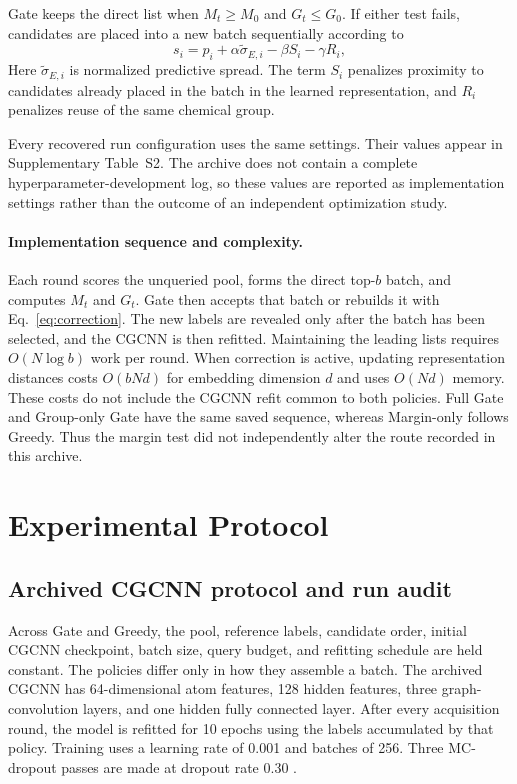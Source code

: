 Gate keeps the direct list when $M_t\ge M_0$ and $G_t\le G_0$. If either test
fails, candidates are placed into a new batch sequentially according to
\begin{equation}
s_i=p_i+\alpha\widetilde{\sigma}_{E,i}-\beta S_i-\gamma R_i,
\label{eq:correction}
\end{equation}
Here $\widetilde{\sigma}_{E,i}$ is normalized predictive spread. The term $S_i$
penalizes proximity to candidates already placed in the batch in the learned
representation, and $R_i$ penalizes reuse of the same chemical group.

Every recovered run configuration uses the same settings. Their values appear
in Supplementary Table~S2. The archive does not
contain a complete hyperparameter-development log, so these values are reported
as implementation settings rather than the outcome of an independent
optimization study.

\paragraph{Implementation sequence and complexity.}
Each round scores the unqueried pool, forms the direct top-$b$ batch, and
computes $M_t$ and $G_t$. Gate then accepts that batch or rebuilds it with
Eq.~\eqref{eq:correction}. The new labels are revealed only after the batch has
been selected, and the CGCNN is then refitted. Maintaining the leading lists
requires $O(N\log b)$ work per round. When correction is active, updating
representation distances costs $O(bNd)$ for embedding dimension $d$ and uses
$O(Nd)$ memory. These costs do not include the CGCNN refit common to both
policies. Full Gate and Group-only Gate have the same saved sequence, whereas
Margin-only follows Greedy. Thus the margin test did not independently alter
the route recorded in this archive.

\section{Experimental Protocol}

\subsection{Archived CGCNN protocol and run audit}

Across Gate and Greedy, the pool, reference labels, candidate order, initial
CGCNN checkpoint, batch size, query budget, and refitting schedule are held
constant. The policies differ only in how they assemble a batch. The archived CGCNN has
64-dimensional atom features, 128 hidden features, three graph-convolution
layers, and one hidden fully connected layer. After every acquisition round,
the model is refitted for 10 epochs using the labels accumulated by that policy.
Training uses a learning rate of 0.001 and batches of 256. Three MC-dropout
passes are made at dropout rate 0.30 \cite{ref-mcdropout}.

